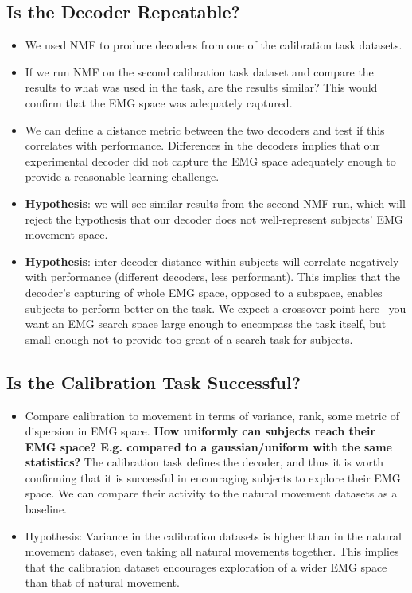 \documentclass[../main.tex]{subfiles}
\begin{document}
\subsection{Is the Decoder Repeatable? \rbrack}

\begin{itemize} 
  \item We used NMF to produce decoders from one of the calibration task datasets. 
  \item If we run NMF on the second calibration task dataset and compare the results to what was used in the task, are the results similar? This would confirm that the EMG space was adequately captured. 
  \item We can define a distance metric between the two decoders and test if this correlates with performance. Differences in the decoders implies that our experimental decoder did not capture the EMG space adequately enough to provide a reasonable learning challenge.
  \item \textbf{Hypothesis}: we will see similar results from the second NMF run, which will reject the hypothesis that our decoder does not well-represent subjects’ EMG movement space.
  \item \textbf{Hypothesis}: inter-decoder distance within subjects will correlate negatively with performance (different decoders, less performant). This implies that the decoder’s capturing of whole EMG space, opposed to a subspace, enables subjects to perform better on the task. We expect a crossover point here– you want an EMG search space large enough to encompass the task itself, but small enough not to provide too great of a search task for subjects.
\end{itemize}


\subsection{Is the Calibration Task Successful? \rbrack}

\begin{itemize}
  \item Compare calibration to movement in terms of variance, rank, some metric of dispersion in EMG space. \textbf{How uniformly can subjects reach their EMG space? E.g. compared to a gaussian/uniform with the same statistics?} The calibration task defines the decoder, and thus it is worth confirming that it is successful in encouraging subjects to explore their EMG space. We can compare their activity to the natural movement datasets as a baseline.
  \item Hypothesis: Variance in the calibration datasets is higher than in the natural movement dataset, even taking all natural movements together. This implies that the calibration dataset encourages exploration of a wider EMG space than that of natural movement.
\end{itemize}
\end{document}

